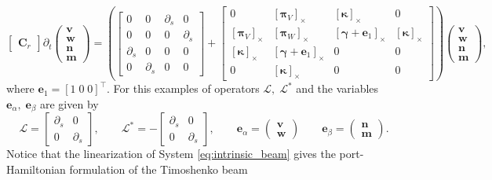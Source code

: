 \documentclass[11pt,a4paper]{article}
\begin{document}
{\begin{equation}
\begin{bmatrix}
\bm{C}_r
\end{bmatrix}
\partial_t
\begin{pmatrix}
\bm{v} \\
\bm{w} \\
\bm{n} \\
\bm{m}
\end{pmatrix}
=
\left(
\begin{bmatrix}
0 &  0 & \partial_s & 0 \\
0 & 0 & 0  & \partial_s \\
\partial_s & 0 & 0 & 0 \\
0 & \partial_s  & 0 & 0
\end{bmatrix}
+ 
\begin{bmatrix}
0 &  [\bm{\pi}_V]_{\times} & [\bm{\kappa}]_{\times} & 0 \\
[\bm{\pi}_V]_{\times} &  [\bm{\pi}_W]_{\times} & [\bm{\gamma} + \bm{e}_1]_{\times}  & [\bm{\kappa}]_{\times} \\
[\bm{\kappa}]_{\times} & [\bm{\gamma} + \bm{e}_1]_{\times}  & 0 & 0 \\
0 & [\bm{\kappa}]_{\times} & 0 & 0
\end{bmatrix}
\right)
\begin{pmatrix}
\bm{v} \\
\bm{w} \\
\bm{n} \\
\bm{m}
\end{pmatrix},
\end{equation}
where $\bm{e}_1 = [1 \; 0\; 0]^\top$. For this examples of operators $\mathcal{L}, \; \mathcal{L}^*$ and the variables $\bm{e}_{\alpha}, \; \bm{e}_\beta$ are given by
$$
\mathcal{L} = \begin{bmatrix}
\partial_s & 0 \\
0 & \partial_s 
\end{bmatrix}, \qquad  \mathcal{L}^* = -\begin{bmatrix}
\partial_s & 0 \\
0 & \partial_s 
\end{bmatrix}, \qquad
\bm{e}_{\alpha} = \begin{pmatrix}
    \bm{v} \\ \bm{w}
\end{pmatrix} \qquad 
\bm{e}_{\beta} = \begin{pmatrix}
    \bm{n} \\ \bm{m}
\end{pmatrix}.
$$
Notice that the linearization of System \eqref{eq:intrinsic_beam} gives the port-Hamiltonian formulation of the Timoshenko beam
}
\end{document}
